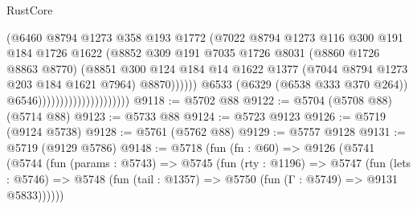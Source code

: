 \begin{lexlean}{RustCore}
\begin{coremodule}
                                                  (@6460
                                                    @8794
                                                    @1273
                                                    @358
                                                    @193
                                                    @1772
                                                    (@7022
                                                      @8794
                                                      @1273
                                                      @116
                                                      @300
                                                      @191
                                                      @184
                                                      @1726
                                                      @1622
                                                      (@8852
                                                        @309
                                                        @191
                                                        @7035
                                                        @1726
                                                        @8031
                                                        (@8860 @1726 @8863 @8770)
                                                        (@8851
                                                          @300
                                                          @124
                                                          @184
                                                          @14
                                                          @1622
                                                          @1377
                                                          (@7044 @8794 @1273 @203 @184 @1621 @7964)
                                                          @8870))))))
                                              @6533
                                              (@6329 (@6538 @333 @370 @264))
                                              @6546)))))))))))))))))))))
@9118 := @5702 @88
@9122 := @5704 (@5708 @88) (@5714 @88)
@9123 := @5733 @88
@9124 := @5723 @9123
@9126 := @5719 (@9124 @5738)
@9128 := @5761 (@5762 @88)
@9129 := @5757 @9128
@9131 := @5719 (@9129 @5786)
@9148 := @5718
    (fun (fn : @60) =>
    @9126
      (@5741
        (@5744
          (fun (params : @5743) =>
          @5745
            (fun (rty : @1196) =>
            @5747
              (fun (lets : @5746) =>
              @5748 (fun (tail : @1357) => @5750 (fun (Γ : @5749) => @9131 @5833))))))

\end{coremodule}
\end{lexlean}
